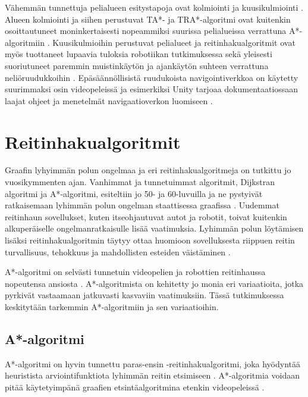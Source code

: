 \documentclass[utf8]{gradu3}
\begin{document}
Vähemmän tunnettuja pelialueen esitystapoja ovat kolmiointi ja kuusikulmiointi \parencite{abd2015comprehensive}. Alueen kolmiointi ja siihen perustuvat TA*- ja TRA*-algoritmi ovat kuitenkin osoittautuneet moninkertaisesti nopeammiksi suurissa pelialueissa verrattuna A*-algoritmiin \parencite{demyen2006efficient}. Kuusikulmioihin perustuvat pelialueet ja reitinhakualgoritmit ovat myös tuottaneet lupaavia tuloksia robotiikan tutkimuksessa sekä yleisesti suoriutuneet paremmin muistinkäytön ja ajankäytön suhteen verrattuna neliöruudukkoihin \parencite{abd2015comprehensive,lawande2022systematic}. Epäsäännöllisistä ruudukoista navigointiverkkoa on käytetty suurimmaksi osin videopeleissä ja esimerkiksi Unity tarjoaa dokumentaatiossaan laajat ohjeet ja menetelmät navigaatioverkon luomiseen \parencite{lawande2022systematic,unitydocnavmesh}.

\section{Reitinhakualgoritmit}

Graafin lyhyimmän polun ongelmaa ja eri reitinhakualgoritmeja on tutkittu jo vuosikymmenten ajan. Vanhimmat ja tunnetuimmat algoritmit, Dijkstran algoritmi ja A*-algoritmi, esiteltiin jo 50- ja 60-luvuilla ja ne pystyivät ratkaisemaan lyhimmän polun ongelman staattisessa graafissa \parencite{dijkstra1959note,hart1968formal} . Uudemmat reitinhaun sovellukset, kuten itseohjautuvat autot ja robotit, toivat kuitenkin alkuperäiselle ongelmanratkaisulle lisää vaatimuksia. Lyhimmän polun löytämisen lisäksi reitinhakualgoritmin täytyy ottaa huomioon sovelluksesta riippuen reitin turvallisuus, tehokkuus ja mahdollisten esteiden väistäminen \parencite{karur2021survey}.

A*-algoritmi on selvästi tunnetuin videopelien ja robottien reitinhaussa nopeutensa ansiosta \parencite{abd2015comprehensive,botea2013pathfinding,cui2011based}. A*-algoritmista on kehitetty jo monia eri variaatioita, jotka pyrkivät vastaamaan jatkuvasti kasvaviin vaatimuksiin. Tässä tutkimuksessa keskitytään tarkemmin A*-algoritmiin ja sen variaatioihin.

\subsection{A*-algoritmi}

A*-algoritmi on hyvin tunnettu paras-ensin -reitinhakualgoritmi, joka hyödyntää heuristista arviointifunktiota lyhimmän reitin etsimiseen \parencite{cui2011based,duchovn2014path}. A*-algoritmia voidaan pitää käytetyimpänä graafien etsintäalgoritmina etenkin videopeleissä \parencite{botea2013pathfinding,lawande2022systematic}.
\end{document}
